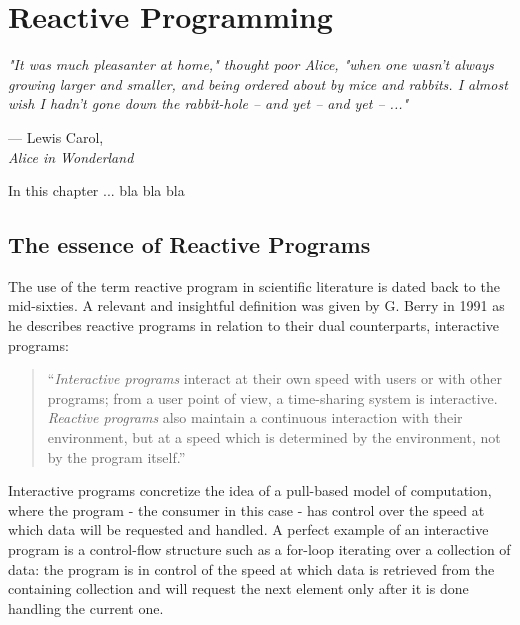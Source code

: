 \clearpage


\let\textcircled=\pgftextcircled
\chapter{Reactive Programming}
\label{chap:reactiveprogramming}

\epigraph{\hspace{4ex}\textit{"It was much pleasanter at home," thought poor Alice, "when one wasn't always growing larger and smaller, and being ordered about by mice and rabbits. I almost wish I hadn't gone down the rabbit-hole -- and yet -- and yet -- ..."}}{--- Lewis Carol,\\ \textit{Alice in Wonderland}}


In this chapter ... bla bla bla


\section{The essence of Reactive Programs}

The use of the term reactive program in scientific literature is dated back to the mid-sixties\cite{scopus-reactive}. A relevant and insightful definition was given by G. Berry in 1991\cite{berry1991reactive} as he describes reactive programs in relation to their dual counterparts, interactive programs:

\begin{quote}
\hspace{4ex}``\textit{Interactive programs} interact at their own speed with users or with other programs; from a user point of view, a time-sharing system is interactive. \textit{Reactive programs} also maintain a continuous interaction with their environment, but at a speed which is determined by the environment, not by the program itself.''
\end{quote}

Interactive programs concretize the idea of a pull-based model of computation, where the program - the consumer in this case - has control over the speed at which data will be requested and handled. A perfect example of an interactive program is a control-flow structure such as a for-loop iterating over a collection of data: the program is in control of the speed at which data is retrieved from the containing collection and will request the next element only after it is done handling the current one.

